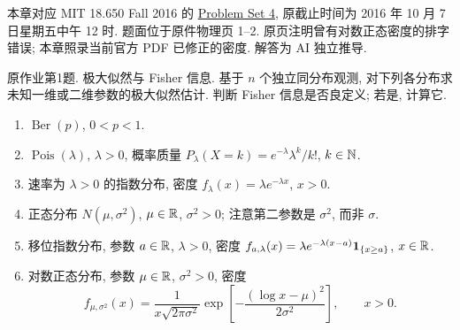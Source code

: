 \label{chap:ps04}
本章对应 MIT 18.650 Fall 2016 的 \href{https://ocw.mit.edu/courses/18-650-statistics-for-applications-fall-2016/resources/problem-set-4/}{Problem Set 4}, 原截止时间为 2016 年 10 月 7 日星期五中午 12 时. 题面位于原件物理页 1--2. 原页注明曾有对数正态密度的排字错误; 本章照录当前官方 PDF 已修正的密度. 解答为 AI 独立推导.

\begin{exercise}\label{ps04:p01}
原作业第1题. 极大似然与 Fisher 信息. 基于 $n$ 个独立同分布观测, 对下列各分布求未知一维或二维参数的极大似然估计. 判断 Fisher 信息是否良定义; 若是, 计算它.
\begin{enumerate}[label=\arabic*.]
\item $\operatorname{Ber}(p)$, $0<p<1$.
\item $\operatorname{Pois}(\lambda)$, $\lambda>0$, 概率质量 $P_\lambda(X=k)=e^{-\lambda}\lambda^k/k!$, $k\in\mathbb N$.
\item 速率为 $\lambda>0$ 的指数分布, 密度 $f_\lambda(x)=\lambda e^{-\lambda x}$, $x>0$.
\item 正态分布 $N(\mu,\sigma^2)$, $\mu\in\mathbb R$, $\sigma^2>0$; 注意第二参数是 $\sigma^2$, 而非 $\sigma$.
\item 移位指数分布, 参数 $a\in\mathbb R$, $\lambda>0$, 密度 $f_{a,\lambda}(x)=\lambda e^{-\lambda(x-a)}\mathbf 1_{\{x\ge a\}}$, $x\in\mathbb R$.
\item 对数正态分布, 参数 $\mu\in\mathbb R$, $\sigma^2>0$, 密度
\[
f_{\mu,\sigma^2}(x)=\frac1{x\sqrt{2\pi\sigma^2}}
\exp\left[-\frac{(\log x-\mu)^2}{2\sigma^2}\right],\qquad x>0.
\]
\end{enumerate}
\end{exercise}
